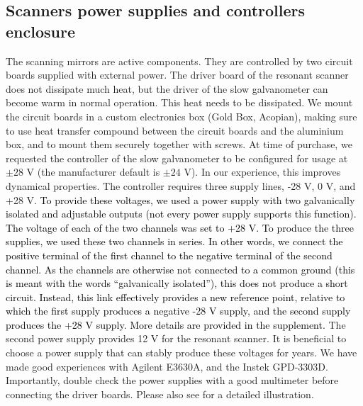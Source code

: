 \documentclass[10pt,letterpaper]{article}
\begin{document}
\subsection*{Scanners power supplies and controllers enclosure}
The scanning mirrors are active components. They are controlled by two circuit boards supplied with external power. The driver board of the resonant scanner does not dissipate much heat, but the driver of the slow galvanometer can become warm in normal operation. This heat needs to be dissipated. We mount the circuit boards in a custom electronics box (Gold Box, Acopian), making sure to use heat transfer compound between the circuit boards and the aluminium box, and to mount them securely together with screws. At time of purchase, we requested the controller of the slow galvanometer to be configured for usage at $\pm 28\text{ V}$ (the manufacturer default is $\pm 24\text{ V}$). In our experience, this  improves dynamical properties. The controller requires three supply lines, -28 V, 0 V, and +28 V. \textcolor{black}{To provide these voltages, we used a power supply with two galvanically isolated and adjustable outputs (not every power supply supports this function). The voltage of each of the two channels was set to +28 V. To produce the three supplies, we used these two channels in series. In other words, we connect the positive terminal of the first channel to the negative terminal of the second channel. As the channels are otherwise not connected to a common ground (this is meant with the words ``galvanically isolated''), this does not produce a short circuit. Instead, this link effectively provides a new reference point, relative to which the first supply produces a negative -28 V supply, and the second supply produces the +28 V supply. More details are provided in the supplement.} The second power supply provides 12 V for the resonant scanner. It is beneficial to choose a power supply that can stably produce these voltages for years. We have made good experiences with Agilent E3630A, and the Instek GPD-3303D. Importantly, double check the power supplies with a good multimeter before connecting the driver boards. Please also see  for a detailed illustration.
\end{document}

